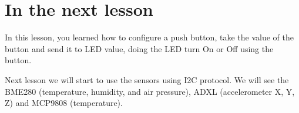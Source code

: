 \documentclass[10pt,twoside,english]{_support/latex/sbabook/sbabook}
\begin{document}
\section{In the next lesson}
In this lesson, you learned how to configure a push button, take the value of the button and send it to LED value, doing the LED turn On or Off using the button.

Next lesson we will start to use the sensors using I2C protocol. We will see the BME280 (temperature, humidity, and air pressure), ADXL (accelerometer X, Y, Z) and MCP9808 (temperature).


\backmatter

\end{document}
